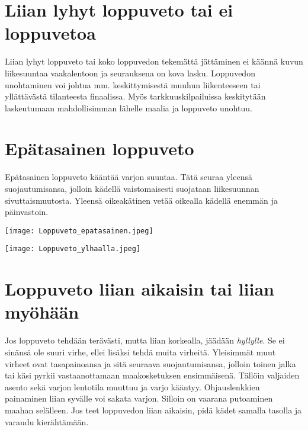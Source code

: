 \section{ Liian lyhyt loppuveto tai ei loppuvetoa }
\label{laskeutumisvirheet-liian-lyhyt-loppuveto-tai-ei-loppuvetoa}


Liian lyhyt loppuveto tai koko loppuvedon tekemättä jättäminen ei käännä kuvun liikesuuntaa vaakalentoon ja seurauksena on kova lasku. Loppuvedon unohtaminen voi johtua mm. keskittymisestä muuhun liikenteeseen tai yllättävästä tilanteesta finaalissa. Myös tarkkuuskilpailuissa keskitytään laskeutumaan mahdollisimman lähelle maalia ja loppuveto unohtuu. 

\section{ Epätasainen loppuveto }
\label{laskeutumisvirheet-epatasainen-loppuveto}


Epätasainen loppuveto kääntää varjon suuntaa. Tätä seuraa yleensä suojautumisansa, jolloin kädellä vaistomaisesti suojataan liikesuunnan sivuttaismuutosta. Yleensä oikeakätinen vetää oikealla kädellä enemmän ja päinvastoin. 


\begin{Figure}\centering\texttt{[image: Loppuveto\_epatasainen.jpeg]}\end{Figure}  \begin{Figure}\centering\texttt{[image: Loppuveto\_ylhaalla.jpeg]}\end{Figure}  

\section{ Loppuveto liian aikaisin tai liian myöhään }
\label{laskeutumisvirheet-loppuveto-liian-aikaisin-tai-liian-myohaan}


Jos loppuveto tehdään terävästi, mutta liian korkealla, jäädään \textit{hyllylle}. Se ei sinänsä ole suuri virhe, ellei lisäksi tehdä muita virheitä. Yleisimmät muut virheet ovat tasapainoansa ja sitä seuraava suojautumisansa, jolloin toinen jalka tai käsi pyrkii vastaanottamaan maakosketuksen ensimmäisenä. Tällöin valjaiden asento sekä varjon lentotila muuttuu ja varjo kääntyy. Ohjauslenkkien painaminen liian syvälle voi sakata varjon. Silloin on vaarana putoaminen maahan selälleen. Jos teet loppuvedon liian aikaisin, pidä kädet samalla tasolla ja varaudu kierähtämään. 


